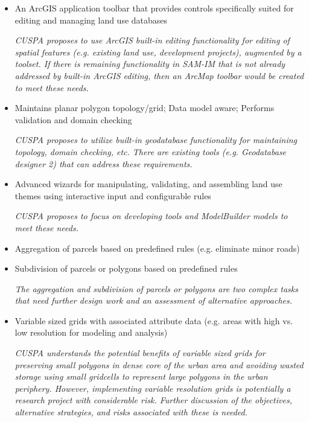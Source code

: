 \documentclass[titlepage]{article}
\begin{document}
\begin{itemize}

\item An ArcGIS application toolbar that provides controls specifically suited for editing and managing land use databases

\emph{CUSPA proposes to use ArcGIS built-in editing functionality for editing of spatial features (e.g. existing land use, development projects), augmented by a toolset.  If there is remaining functionality in SAM-IM that is not already addressed by built-in ArcGIS editing, then an ArcMap toolbar would be created to meet these needs.}

\item Maintains planar polygon topology/grid; Data model aware; Performs validation and domain checking

\emph{CUSPA proposes to utilize built-in geodatabase functionality for maintaining topology, domain checking, etc.  There are existing tools (e.g. Geodatabase designer 2) that can address these requirements.}

\item Advanced wizards for manipulating, validating, and assembling land use themes using interactive input and configurable rules

\emph{CUSPA proposes to focus on developing tools and ModelBuilder models to meet these needs.}

\item Aggregation of parcels based on predefined rules (e.g. eliminate minor roads)

\item Subdivision of parcels or polygons based on predefined rules

\emph{The aggregation and subdivision of parcels or polygons are two complex tasks that need further design work and an assessment of alternative approaches.}

\item Variable sized grids with associated attribute data (e.g. areas with high vs. low resolution for modeling and analysis)

\emph{CUSPA understands the potential benefits of variable sized grids for preserving small polygons in dense core of the urban area and avoiding wasted storage using small gridcells to represent large polygons in the urban periphery.  However, implementing variable resolution grids is potentially a research project with considerable risk.  Further discussion of the objectives, alternative strategies, and risks associated with these is needed.}


\end{itemize}
\end{document}
